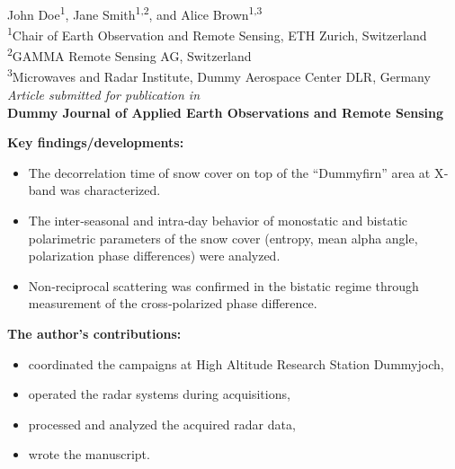 \begin{refsection}
    \begin{center}
        John Doe\textsuperscript{1}, Jane Smith\textsuperscript{1,2}, and Alice Brown\textsuperscript{1,3}\\[0.75em]
        {\footnotesize
        \textsuperscript{1}Chair of Earth Observation and Remote Sensing, ETH Zurich, Switzerland\\
        \textsuperscript{2}GAMMA Remote Sensing AG, Switzerland\\
        \textsuperscript{3}Microwaves and Radar Institute, Dummy Aerospace Center DLR, Germany
        }\\[1em]
        \textit{Article submitted for publication in}\\
        \textbf{Dummy Journal of Applied Earth Observations and Remote Sensing}
    \end{center}
    \noindent
    \textbf{Key findings/developments:}
    \begin{itemize}
      \item The decorrelation time of snow cover on top of the “Dummyfirn” area at X‐band was characterized.
      \item The inter‐seasonal and intra‐day behavior of monostatic and bistatic polarimetric parameters of the snow cover (entropy, mean alpha angle, polarization phase differences) were analyzed.
      \item Non‐reciprocal scattering was confirmed in the bistatic regime through measurement of the cross‐polarized phase difference.
    \end{itemize}
    
    \vspace{1em}
    \noindent
    \textbf{The author’s contributions:}
    \begin{itemize}
      \item coordinated the campaigns at High Altitude Research Station Dummyjoch,
      \item operated the radar systems during acquisitions,
      \item processed and analyzed the acquired radar data,
      \item wrote the manuscript.
    \end{itemize}
    

\end{refsection}
